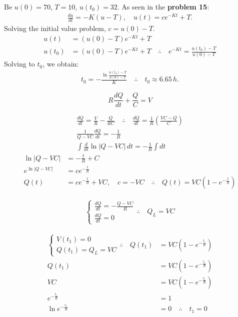 \begin{solution}
	Be $u(0)=70$, $T=10$, $u(t_0)=32$. As seen in the \textbf{problem 15}:
	\begin{gather*}
		\frac{du}{dt}=-K(u-T),\quad u(t)=ce^{-Kt}+T.
	\end{gather*}
	Solving the initial value problem, $c=u(0)-T$.
	\begin{align*}
		u(t)&=(u(0)-T)e^{-Kt}+T\\
		u(t_0)&=(u(0)-T)e^{-Kt}+T \quad \therefore \quad e^{-Kt}=\frac{u(t_0)-T}{u(0)-T}
	\end{align*}
	Solving to $t_0$, we obtain:
	\begin{gather*}
		t_0=-\frac{\ln \frac{u(t_0)-T}{u(0)-T}}{K}\quad \therefore \quad \boxed{t_0 \approx 6.65\, h}.
	\end{gather*}
\end{solution}

\begin{solution}
	$$R\frac{dQ}{dt}+\frac{Q}{C}=V$$
	\begin{solparts}
		\item
		\begin{gather*}
			\frac{dQ}{dt}=\frac{V}{R}-\frac{Q}{RC} \quad \therefore \quad \frac{dQ}{dt}=\frac{1}{R}\left(\frac{VC-Q}{C}\right)\\
			\frac{1}{Q-VC}\frac{dQ}{dt}=-\frac{1}{R}\\
			\int \frac{d}{dt}\ln |Q-VC|\, dt=-\frac{1}{R}\int dt
		\end{gather*}
		\begin{align*}
			\ln |Q-VC|&=-\frac{t}{R}+C\\
			e^{\ln |Q-VC|}&=ce^{-\frac{t}{R}}\\
			Q(t)&=ce^{-\frac{t}{R}}+VC,\quad c=-VC \quad \therefore \quad \boxed{Q(t)=VC(1-e^{-\frac{t}{R}})}
		\end{align*}
	
		\item 
		\begin{gather*}
			\begin{cases}
				\frac{dQ}{dt}=-\frac{Q-VC}{R}\\
				\frac{dQ}{dt}=0
			\end{cases}
		\therefore \quad \boxed{Q_L=VC}
		\end{gather*}
		
		\item 
		\begin{align*}
			\begin{cases}
				V(t_1)=0\\
				Q(t_1)=Q_L=VC
			\end{cases}
		\therefore \quad Q(t_1)&=VC(1-e^{-\frac{t_1}{R}})\\
		Q(t_1)&=VC(1-e^{-\frac{t_1}{R}})\\
		VC&=VC(1-e^{-\frac{t_1}{R}})\\
		e^{-\frac{t_1}{R}}&=1\\
		\ln e^{-\frac{t_1}{R}}&=0 \quad \therefore \quad \boxed{t_1 = 0}
		\end{align*}
	\end{solparts}
\end{solution}

